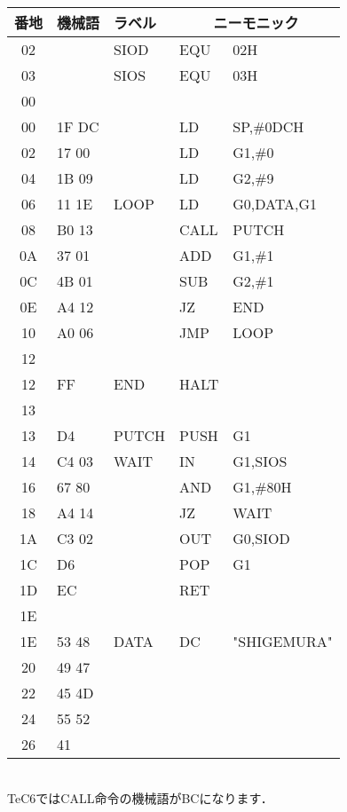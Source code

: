\begin{center}
{{\begin{description}
\begin{center}
{\footnotesize\tt
\begin{tabular}{|c|l|l|l l|} \hline
番地 & 機械語 & ラベル & \multicolumn{2}{|c|}{ニーモニック} \\
\hline
02 &       & SIOD  & EQU  & 02H             \\
03 &       & SIOS  & EQU  & 03H             \\
00 &       &       &      &                 \\
00 & 1F DC &       & LD   & SP,\#0DCH       \\
02 & 17 00 &       & LD   & G1,\#0          \\
04 & 1B 09 &       & LD   & G2,\#9          \\
06 & 11 1E & LOOP  & LD   & G0,DATA,G1      \\
08 & B0 13 &       & CALL & PUTCH           \\
0A & 37 01 &       & ADD  & G1,\#1          \\
0C & 4B 01 &       & SUB  & G2,\#1          \\
0E & A4 12 &       & JZ   & END             \\
10 & A0 06 &       & JMP  & LOOP            \\
12 &       &       &      &                 \\
12 & FF    & END   & HALT &                 \\
13 &       &       &      &                 \\
13 & D4    & PUTCH & PUSH & G1              \\
14 & C4 03 & WAIT  & IN   & G1,SIOS         \\
16 & 67 80 &       & AND  & G1,\#80H        \\
18 & A4 14 &       & JZ   & WAIT            \\
1A & C3 02 &       & OUT  & G0,SIOD         \\
1C & D6    &       & POP  & G1              \\
1D & EC    &       & RET  &                 \\
1E &       &       &      &                 \\
1E & 53 48 & DATA  & DC   & "SHIGEMURA"     \\
20 & 49 47 &       &      &                 \\
22 & 45 4D &       &      &                 \\
24 & 55 52 &       &      &                 \\
26 & 41    &       &      &                 \\
\hline
\end{tabular}
\\TeC6ではCALL命令の機械語がBCになります．
}
\end{center}
\end{description}
}}
\end{center}

